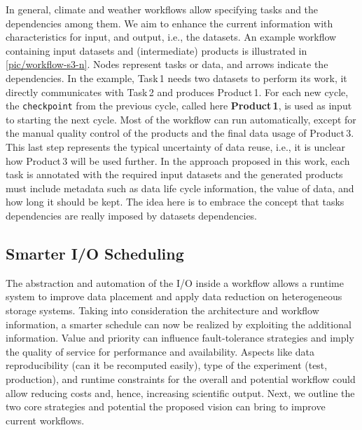 \documentclass{superfri}
\begin{document}
In general, climate and weather workflows allow specifying tasks and the dependencies among them.
We aim to enhance the current information with characteristics for input, and output, i.e., the datasets.
An example workflow containing input datasets and (intermediate) products is illustrated in \cref{pic/workflow-s3-n}.
Nodes represent tasks or data, and arrows indicate the dependencies.
In the example, Task\,1 needs two datasets to perform its work, it directly communicates with Task\,2 and produces Product\,1.
For each new cycle, the \texttt{checkpoint} from the previous cycle, called here \textbf{Product\,1}, is used as input to starting the next cycle.
Most of the workflow can run automatically, except for the manual quality control of the products and the final data usage of Product\,3.
This last step represents the typical uncertainty of data reuse, i.e., it is unclear how Product\,3 will be used further.
In the approach proposed in this work, each task is annotated with the required input datasets and the generated products must include metadata such as data life cycle information, the value of data, and how long it should be kept.
The idea here is to embrace the concept that tasks dependencies are really imposed by datasets dependencies.



\subsection{Smarter I/O Scheduling}

The abstraction and automation of the I/O inside a workflow allows a runtime system to improve data placement and apply data reduction on heterogeneous storage systems.
Taking into consideration the architecture and workflow information, a smarter schedule can now be realized by exploiting the additional information.
Value and priority can influence fault-tolerance strategies and imply the quality of service for performance and availability.
Aspects like data reproducibility (can it be recomputed easily), type of the experiment (test, production), and runtime constraints for the overall and potential workflow could allow reducing costs and, hence, increasing scientific output.
Next, we outline the two core strategies and potential the proposed vision can bring to improve current workflows.
\end{document}
